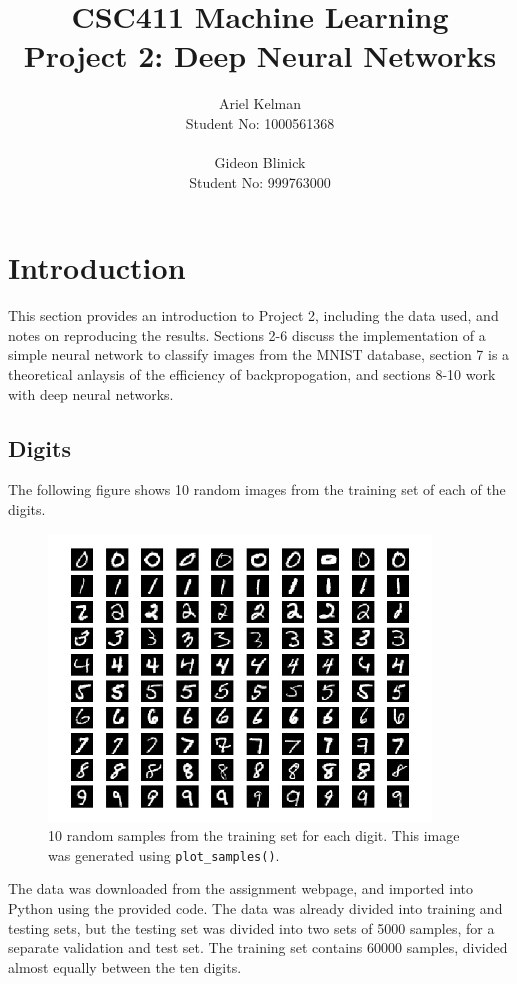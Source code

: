 \documentclass{article}
\title{CSC411 Machine Learning \\ Project 2: Deep Neural Networks}
\author{ Ariel Kelman \\ Student No: 1000561368
         \\ \\
         Gideon Blinick \\ Student No: 999763000 }
\begin{document}
   \maketitle{}


   \section{Introduction}
   This section provides an introduction to Project 2, including the data used, and notes
   on reproducing the results. Sections 2-6 discuss the implementation of a simple neural
   network to classify images from the MNIST database, section 7 is a theoretical anlaysis
   of the efficiency of backpropogation, and sections 8-10 work with deep neural networks.

   \subsection{Digits}
   The following figure shows 10 random images from the training set of each of the digits.
   \begin{figure}[H] \centering
      \includegraphics[width=4in]{resources/part1}
      \caption{10 random samples from the training set for each digit. This image
         was generated using \texttt{plot\_samples()}. }
   \end{figure}
   The data was downloaded from the assignment webpage, and imported into Python using the
   provided code. The data was already divided into training and testing sets, but the testing
   set was divided into two sets of 5000 samples, for a separate validation and test set.
   The training set contains 60000 samples, divided almost equally between the ten digits.
\end{document}
